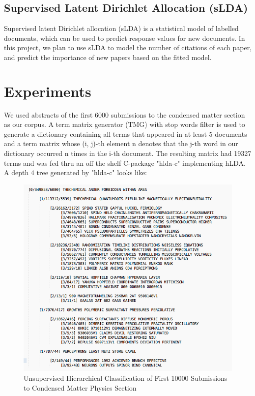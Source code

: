 \documentclass[DIV=calc, paper=a4, fontsize=11pt, twocolumn]{scrartcl}	 %
\begin{document}
\subsection*{Supervised Latent Dirichlet Allocation (sLDA)}
Supervised latent Dirichlet allocation (sLDA) is a statistical model of labelled documents, which can be used to predict response values for new documents. In this project, we plan to use sLDA to model the number of citations of each paper, and predict the importance of new papers based on the fitted model.
\section*{Experiments}

We used abstracts of the first 6000 submissions to the condensed matter section as our corpus. A term matrix generator (TMG) \cite{5} with stop words filter is used to generate a dictionary containing all terms that appeared in at least 5 documents and a term matrix whose (i, j)-th element n denotes that the j-th word in our dictionary occurred n times in the i-th document. The resulting matrix had 19327 terms and was fed thru an off the shelf C-package "hlda-c" \cite{1} implementing hLDA.\\
A depth 4 tree generated by "hlda-c" looks like:\newline
			\begin{figure}[!ht]
				\centerline{\includegraphics[scale = 0.35]{tree10000.png}}
				\caption{Unsupervised Hierarchical Classification of First 10000 Submissions to Condensed Matter Physics Section}
			\end{figure}
\end{document}
